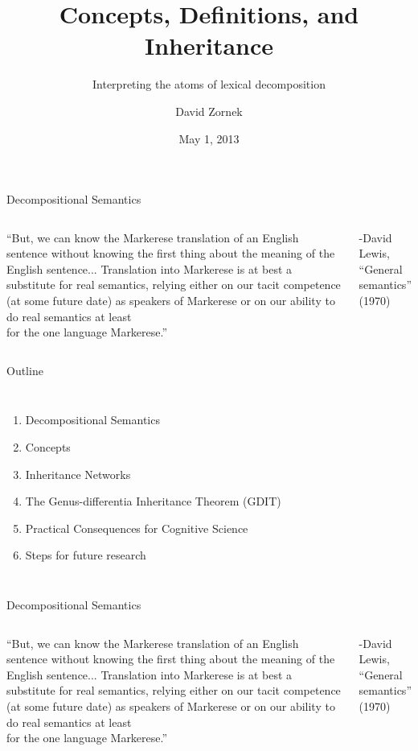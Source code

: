 \documentclass{beamer}
\title{Concepts, Definitions, and Inheritance}
\subtitle{Interpreting the atoms of lexical decomposition}
\author{David Zornek}
\institute[CMU]{
  Department of Philosophy\\
  Carnegie Mellon University\\
  \texttt{dzornek@andrew.cmu.edu}
}
\date{May 1, 2013}
\begin{document}
\begin{frame}[plain]
  \titlepage
\end{frame}

\begin{frame}{Decompositional Semantics}
\begin{columns}
``But, we can know the Markerese translation of an English sentence without knowing the first thing about the meaning of the English sentence... Translation into Markerese is at best a substitute for real semantics, relying either on our tacit competence (at some future date) as speakers of Markerese or on our ability to do real semantics at least \\ for the one language Markerese.''
\par\vspace{.25in}
\hfill -David Lewis, ``General semantics'' (1970)
\end{columns}
\end{frame}

\begin{frame}{Outline}
\begin{columns}
\begin{enumerate}
\item Decompositional Semantics
\vspace{.125in}
\item Concepts
\vspace{.125in}
\item Inheritance Networks
\vspace{.125in}
\item The Genus-differentia Inheritance Theorem (GDIT)
\vspace{.125in}
\item Practical Consequences for Cognitive Science
\vspace{.125in}
\item Steps for future research
\end{enumerate}
\end{columns}
\end{frame}

\begin{frame}{Decompositional Semantics}
\begin{columns}
``But, we can know the Markerese translation of an English sentence without knowing the first thing about the meaning of the English sentence... Translation into Markerese is at best a substitute for real semantics, relying either on our tacit competence (at some future date) as speakers of Markerese or on our ability to do real semantics at least \\ for the one language Markerese.''
\par\vspace{.25in}
\hfill -David Lewis, ``General semantics'' (1970)
\end{columns}
\end{frame}
\end{document}
